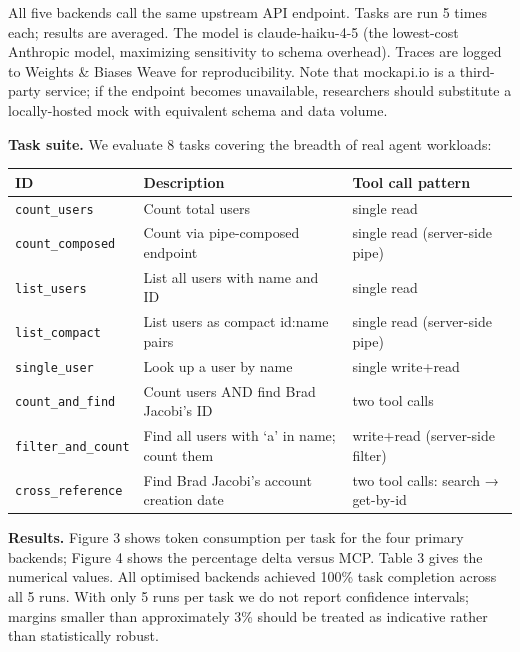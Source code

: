 \documentclass[
  11pt,
]{article}
\begin{document}
All five backends call the same upstream API endpoint. Tasks are run 5
times each; results are averaged. The model is claude-haiku-4-5 (the
lowest-cost Anthropic model, maximizing sensitivity to schema overhead).
Traces are logged to Weights \& Biases Weave for reproducibility. Note
that mockapi.io is a third-party service; if the endpoint becomes
unavailable, researchers should substitute a locally-hosted mock with
equivalent schema and data volume.

\textbf{Task suite.} We evaluate 8 tasks covering the breadth of real
agent workloads:

\begin{longtable}[]{@{}
  >{\raggedright\arraybackslash}p{}
  >{\raggedright\arraybackslash}p{}
  >{\raggedright\arraybackslash}p{}@{}}
\toprule
ID & Description & Tool call pattern \\
\midrule
\endhead
\texttt{count\_users} & Count total users & single read \\
\texttt{count\_composed} & Count via pipe-composed endpoint & single
read (server-side pipe) \\
\texttt{list\_users} & List all users with name and ID & single read \\
\texttt{list\_compact} & List users as compact id:name pairs & single
read (server-side pipe) \\
\texttt{single\_user} & Look up a user by name & single write+read \\
\texttt{count\_and\_find} & Count users AND find Brad Jacobi's ID & two
tool calls \\
\texttt{filter\_and\_count} & Find all users with `a' in name; count
them & write+read (server-side filter) \\
\texttt{cross\_reference} & Find Brad Jacobi's account creation date &
two tool calls: search → get-by-id \\
\bottomrule
\end{longtable}

\textbf{Results.} Figure 3 shows token consumption per task for the four
primary backends; Figure 4 shows the percentage delta versus MCP. Table
3 gives the numerical values. All optimised backends achieved 100\% task
completion across all 5 runs. With only 5 runs per task we do not report
confidence intervals; margins smaller than approximately 3\% should be
treated as indicative rather than statistically robust.
\end{document}
